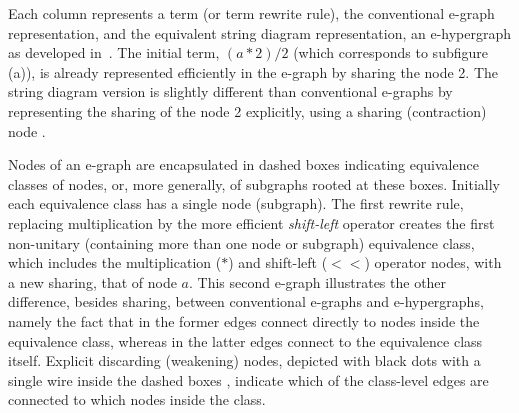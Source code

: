 \documentclass[peerreviewcls]{IEEEtran}
\begin{document}
Each column represents a term (or term rewrite rule), the conventional e-graph representation, and the equivalent string diagram representation, an e-hypergraph as developed in~\cite{ghica2024equivalencehypergraphsegraphsmonoidal}. 
The initial term, $(a*2)/2$ (which corresponds to subfigure (a)), is already represented efficiently in the e-graph by sharing the node 2.
The string diagram version is slightly different than conventional e-graphs by representing the sharing of the node 2 explicitly, using a sharing (contraction) node
. 

Nodes of an e-graph are encapsulated in dashed boxes indicating equivalence classes of nodes, or, more generally, of subgraphs rooted at these boxes.
Initially each equivalence class has a single node (subgraph).
The first rewrite rule, replacing multiplication by the more efficient \emph{shift-left} operator creates the first non-unitary (containing more than one node or subgraph) equivalence class, which includes the multiplication ($*$) and shift-left ($<\!\!<$) operator nodes, with a new sharing, that of node $a$.
This second e-graph illustrates the other difference, besides sharing, between conventional e-graphs and e-hypergraphs, namely the fact that in the former edges connect directly to nodes inside the equivalence class, whereas in the latter edges connect to the equivalence class itself.
Explicit discarding (weakening) nodes, depicted with black dots with a single wire inside the dashed boxes 
, indicate which of the class-level edges are connected to which nodes inside the class.
\end{document}
